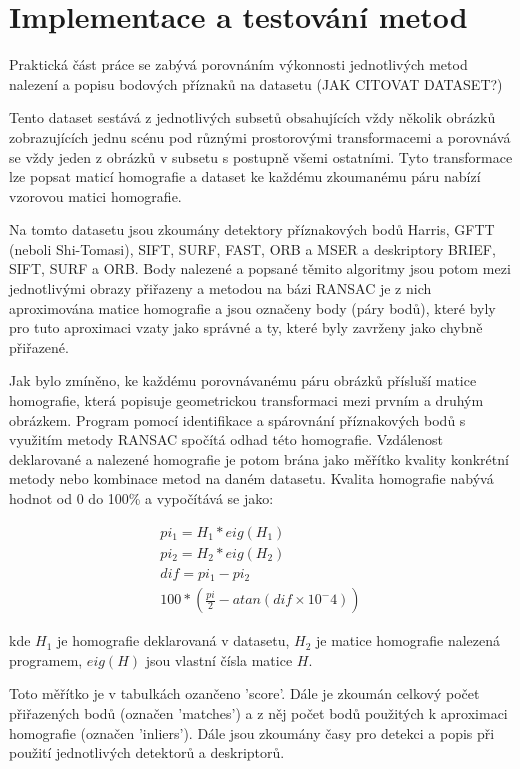 
\chapter{Implementace a testování metod}
\label{chap:impl}

Praktická část práce se zabývá porovnáním výkonnosti jednotlivých
metod nalezení a popisu bodových příznaků na datasetu (JAK CITOVAT DATASET?)

Tento dataset sestává z jednotlivých subsetů obsahujících vždy několik obrázků
zobrazujících jednu scénu pod různými prostorovými transformacemi a porovnává se
vždy jeden z obrázků v subsetu s postupně všemi ostatními. Tyto transformace
lze popsat maticí homografie a dataset ke každému zkoumanému páru nabízí vzorovou
matici homografie.

Na tomto datasetu jsou zkoumány detektory příznakových bodů Harris, GFTT (neboli
Shi-Tomasi), SIFT, SURF, FAST, ORB a MSER a deskriptory BRIEF, SIFT, SURF a ORB.
Body nalezené a popsané těmito algoritmy jsou potom mezi jednotlivými obrazy
přiřazeny a metodou na bázi RANSAC je z nich aproximována matice homografie a 
jsou označeny body (páry bodů), které byly pro tuto aproximaci vzaty jako správné a ty, 
které byly zavrženy jako chybně přiřazené. 


Jak bylo zmíněno, ke každému porovnávanému páru obrázků přísluší matice homografie,
která popisuje geometrickou transformaci mezi prvním a druhým obrázkem. Program
pomocí identifikace a spárovnání příznakových bodů s využitím metody RANSAC spočítá
odhad této homografie. Vzdálenost deklarované a nalezené homografie je potom brána
jako měřítko kvality konkrétní metody nebo kombinace metod na daném datasetu. Kvalita
homografie nabývá hodnot od 0 do 100\% a vypočítává se jako:

\begin{align}
	pi_1 = H_1 * eig(H_1) \\
	pi_2 = H_2 * eig(H_2) \\
	dif = pi_1 - pi_2 \\
	100*(\frac{pi}{2} - atan(dif \times{} 10^-4))
\end{align}

kde $H_1$ je homografie deklarovaná v datasetu, $H_2$ je matice homografie nalezená
programem, $eig(H)$ jsou vlastní čísla matice $H$. 

Toto měřítko je v tabulkách ozančeno 'score'. Dále je zkoumán celkový počet přiřazených
bodů (označen 'matches') a z něj počet bodů použitých k aproximaci homografie (označen 'inliers').
Dále jsou zkoumány časy pro detekci a popis při použití jednotlivých detektorů a deskriptorů. 

